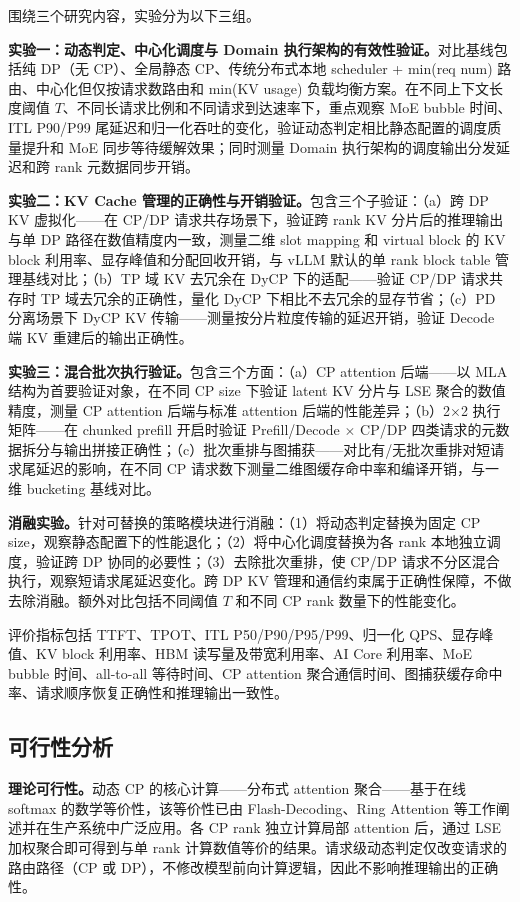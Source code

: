 围绕三个研究内容，实验分为以下三组。

\textbf{实验一：动态判定、中心化调度与 Domain 执行架构的有效性验证。}对比基线包括纯 DP（无 CP）、全局静态 CP、传统分布式本地 scheduler + min(req num) 路由、中心化但仅按请求数路由和 min(KV usage) 负载均衡方案。在不同上下文长度阈值 $T$、不同长请求比例和不同请求到达速率下，重点观察 MoE bubble 时间、ITL P90/P99 尾延迟和归一化吞吐的变化，验证动态判定相比静态配置的调度质量提升和 MoE 同步等待缓解效果；同时测量 Domain 执行架构的调度输出分发延迟和跨 rank 元数据同步开销。

\textbf{实验二：KV Cache 管理的正确性与开销验证。}包含三个子验证：（a）跨 DP KV 虚拟化——在 CP/DP 请求共存场景下，验证跨 rank KV 分片后的推理输出与单 DP 路径在数值精度内一致，测量二维 slot mapping 和 virtual block 的 KV block 利用率、显存峰值和分配回收开销，与 vLLM 默认的单 rank block table 管理基线对比；（b）TP 域 KV 去冗余在 DyCP 下的适配——验证 CP/DP 请求共存时 TP 域去冗余的正确性，量化 DyCP 下相比不去冗余的显存节省；（c）PD 分离场景下 DyCP KV 传输——测量按分片粒度传输的延迟开销，验证 Decode 端 KV 重建后的输出正确性。

\textbf{实验三：混合批次执行验证。}包含三个方面：（a）CP attention 后端——以 MLA 结构为首要验证对象，在不同 CP size 下验证 latent KV 分片与 LSE 聚合的数值精度，测量 CP attention 后端与标准 attention 后端的性能差异；（b）2$\times$2 执行矩阵——在 chunked prefill 开启时验证 Prefill/Decode $\times$ CP/DP 四类请求的元数据拆分与输出拼接正确性；（c）批次重排与图捕获——对比有/无批次重排对短请求尾延迟的影响，在不同 CP 请求数下测量二维图缓存命中率和编译开销，与一维 bucketing 基线对比。

\textbf{消融实验。}针对可替换的策略模块进行消融：（1）将动态判定替换为固定 CP size，观察静态配置下的性能退化；（2）将中心化调度替换为各 rank 本地独立调度，验证跨 DP 协同的必要性；（3）去除批次重排，使 CP/DP 请求不分区混合执行，观察短请求尾延迟变化。跨 DP KV 管理和通信约束属于正确性保障，不做去除消融。额外对比包括不同阈值 $T$ 和不同 CP rank 数量下的性能变化。

评价指标包括 TTFT、TPOT、ITL P50/P90/P95/P99、归一化 QPS、显存峰值、KV block 利用率、HBM 读写量及带宽利用率、AI Core 利用率、MoE bubble 时间、all-to-all 等待时间、CP attention 聚合通信时间、图捕获缓存命中率、请求顺序恢复正确性和推理输出一致性。

\subsection{可行性分析}

\textbf{理论可行性。}动态 CP 的核心计算——分布式 attention 聚合——基于在线 softmax 的数学等价性，该等价性已由 Flash-Decoding\citep{flashdecoding2023}、Ring Attention\citep{liu2023ringattention} 等工作阐述并在生产系统中广泛应用。各 CP rank 独立计算局部 attention 后，通过 LSE 加权聚合即可得到与单 rank 计算数值等价的结果。请求级动态判定仅改变请求的路由路径（CP 或 DP），不修改模型前向计算逻辑，因此不影响推理输出的正确性。

